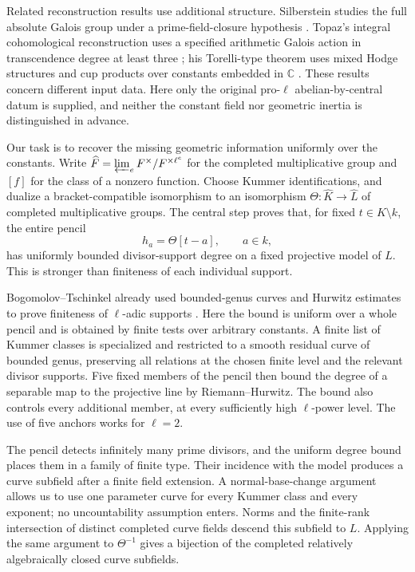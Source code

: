 Related reconstruction results use additional structure.
Silberstein studies the full absolute Galois group under a
prime-field-closure hypothesis \cite{Silberstein2013}.
Topaz's integral cohomological reconstruction uses a specified
arithmetic Galois action in transcendence degree at least three
\cite[Theorems~A and~B]{Topaz2019}; his Torelli-type theorem uses
mixed Hodge structures and cup products over constants embedded in
$\mathbb C$ \cite{TopazTorelli2025}.
These results concern different input data.  Here only the original
pro-$\ell$ abelian-by-central datum is supplied, and neither the
constant field nor geometric inertia is distinguished in advance.

Our task is to recover the missing geometric information uniformly over
the constants.  Write $\widehat F=\varprojlim_e F^\times/F^{\times\ell^e}$
for the completed multiplicative group and $[f]$ for the class of a
nonzero function.  Choose Kummer identifications, and dualize a
bracket-compatible isomorphism to an isomorphism
$\Theta:\widehat K\to\widehat L$ of completed multiplicative groups.
The central step proves that, for fixed $t\in K\setminus k$, the entire
pencil
\[
 h_a=\Theta[t-a],\qquad a\in k,
\]
has uniformly bounded divisor-support degree on a fixed projective model
of $L$.  This is stronger than finiteness of each individual support.

Bogomolov--Tschinkel already used bounded-genus curves and Hurwitz
estimates to prove finiteness of $\ell$-adic supports
\cite[Section~6, proof of Proposition~6.1]{BT2011}.
Here the bound is uniform over a whole pencil and is obtained by finite
tests over arbitrary constants.  A finite list of Kummer classes
is specialized and restricted to a smooth residual curve of bounded
genus, preserving all relations at the chosen finite level and the
relevant divisor supports.  Five fixed members of the pencil then bound
the degree of a separable map to the projective line by Riemann--Hurwitz.
The bound also controls every additional member, at every sufficiently
high $\ell$-power level.  The use of five anchors works for $\ell=2$.

The pencil detects infinitely many prime divisors, and the uniform
degree bound places them in a family of finite type.  Their incidence
with the model produces a curve subfield
after a finite field extension.  A normal-base-change argument allows us
to use one parameter curve for every Kummer class and every exponent;
no uncountability assumption enters.  Norms and the finite-rank
intersection of distinct completed curve fields descend this subfield
to $L$.  Applying the same argument to $\Theta^{-1}$ gives a bijection
of the completed relatively algebraically closed curve subfields.

